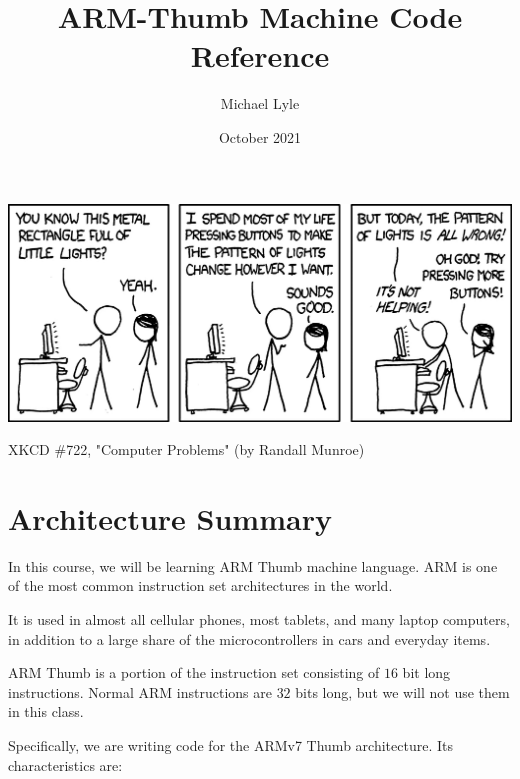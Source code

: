 \documentclass[12pt]{article}
\title{ARM-Thumb Machine Code Reference}
\author{Michael Lyle}
\date{October 2021}
\begin{document}
\maketitle
\tableofcontents
\vspace{5.5cm}
\begin{center}
\includegraphics[width=5.25in]{computer_problems.png}

\scriptsize{XKCD \#722, "Computer Problems" (by Randall Munroe)}
\end{center}

\newpage

\section{Architecture Summary}

In this course, we will be learning ARM Thumb machine language.  ARM is one of the most common instruction set architectures in the world.\vspace{0.5cm}

It is used in almost all cellular phones, most tablets, and many laptop computers, in addition to a large share of the microcontrollers in cars and everyday items. \vspace{0.5cm}

ARM Thumb is a portion of the instruction set consisting of $16$ bit long instructions.  Normal ARM instructions are $32$ bits long, but we will not use them in this class.\vspace{0.5cm}

Specifically, we are writing code for the ARMv7 Thumb architecture.  Its characteristics are:
\end{document}

